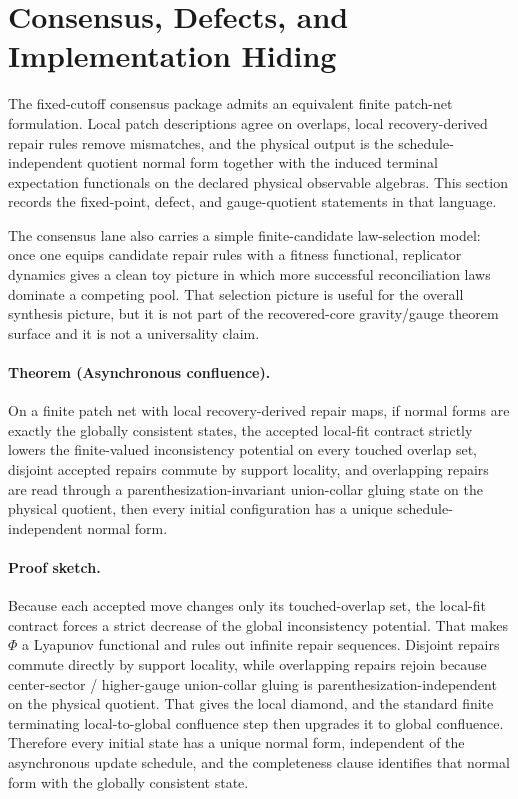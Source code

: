 \section{Consensus, Defects, and Implementation Hiding}

The fixed-cutoff consensus package admits an equivalent finite patch-net formulation. Local patch descriptions agree on
overlaps, local recovery-derived repair rules remove mismatches, and the physical output is the
schedule-independent quotient normal form together with the induced terminal expectation
functionals on the declared physical observable algebras. This section records the fixed-point,
defect, and gauge-quotient statements in that language.

The consensus lane also carries a simple finite-candidate law-selection model: once one equips
candidate repair rules with a fitness functional, replicator dynamics gives a clean toy picture in
which more successful reconciliation laws dominate a competing pool. That selection picture is
useful for the overall synthesis picture, but it is not part of the recovered-core gravity/gauge
theorem surface and it is not a universality claim.

\paragraph{Theorem (Asynchronous confluence).}
On a finite patch net with local recovery-derived repair maps, if normal forms are exactly the
globally consistent states, the accepted local-fit contract strictly lowers the finite-valued
inconsistency potential on every touched overlap set, disjoint accepted repairs commute by support
locality, and overlapping repairs are read through a parenthesization-invariant union-collar
gluing state on the physical quotient, then every initial configuration has a unique
schedule-independent normal form.

\paragraph{Proof sketch.}
Because each accepted move changes only its touched-overlap set, the local-fit contract forces a
strict decrease of the global inconsistency potential. That makes \(\Phi\) a Lyapunov functional
and rules out infinite repair sequences. Disjoint repairs commute directly by support locality, while overlapping
repairs rejoin because center-sector / higher-gauge union-collar gluing is
parenthesization-independent on the physical quotient. That gives the local diamond, and the
standard finite terminating local-to-global confluence step then upgrades it to global
confluence. Therefore every initial state has a
unique normal form, independent of the asynchronous update schedule, and the completeness clause
identifies that normal form with the globally consistent state.

